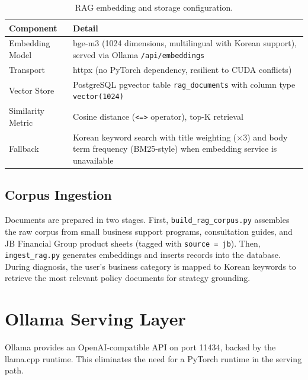 \documentclass[11pt, a4paper]{article}
\begin{document}
\begin{table}[H]
\centering
\caption{RAG embedding and storage configuration.}
\label{tab:rag}
\renewcommand{\arraystretch}{1.35}
\begin{tabularx}{\textwidth}{M{3.0cm} L}
\toprule
\textbf{Component}   & \textbf{Detail} \\
\midrule
Embedding Model      & bge-m3 (1024 dimensions, multilingual with
                       Korean support), served via Ollama
                       \texttt{/api/embeddings} \\
Transport            & httpx (no PyTorch dependency, resilient to
                       CUDA conflicts) \\
Vector Store         & PostgreSQL pgvector table
                       \texttt{rag\_documents} with column type
                       \texttt{vector(1024)} \\
Similarity Metric    & Cosine distance (\texttt{<=>} operator),
                       top-K retrieval \\
Fallback             & Korean keyword search with title weighting
                       ($\times 3$) and body term frequency
                       (BM25-style) when embedding service is
                       unavailable \\
\bottomrule
\end{tabularx}
\end{table}

\subsection{Corpus Ingestion}

Documents are prepared in two stages.
First, \texttt{build\_rag\_corpus.py} assembles the raw corpus
from small business support programs, consultation guides, and
JB Financial Group product sheets (tagged with
\texttt{source = jb}).
Then, \texttt{ingest\_rag.py} generates embeddings and inserts
records into the database.
During diagnosis, the user's business category is mapped to
Korean keywords to retrieve the most relevant policy documents
for strategy grounding.


\section{Ollama Serving Layer}

Ollama provides an OpenAI-compatible API on port 11434, backed by
the llama.cpp runtime.
This eliminates the need for a PyTorch runtime in the serving path.
\end{document}
